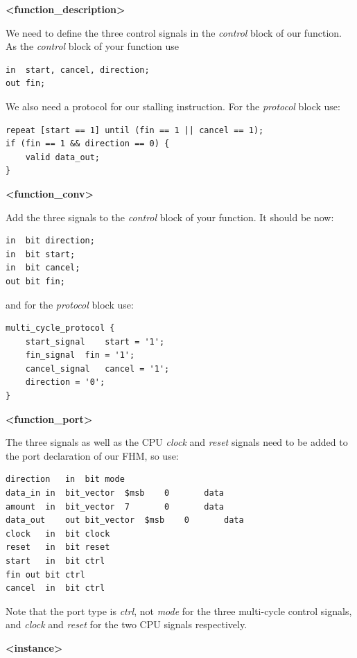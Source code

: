 \textbf{\textless function\_description\textgreater{}}

We need to define the three control signals in the \emph{control} block
of our function. As the \emph{control} block of your function use
\begin{lstlisting}
in  start, cancel, direction;
out fin;	
\end{lstlisting}
We also need a protocol for our stalling instruction. For the
\emph{protocol} block use:
\begin{lstlisting}
repeat [start == 1] until (fin == 1 || cancel == 1);
if (fin == 1 && direction == 0) {
	valid data_out;
}	
\end{lstlisting}
\textbf{\textless function\_conv\textgreater{}}

Add the three signals to the \emph{control} block of your function. It
should be now:
\begin{lstlisting}
in  bit direction;
in  bit start;
in  bit cancel;
out bit fin;	
\end{lstlisting}
and for the \emph{protocol} block use:
\begin{lstlisting}
multi_cycle_protocol {
	start_signal	start = '1';
	fin_signal	fin = '1';
	cancel_signal	cancel = '1';
	direction = '0';
}	
\end{lstlisting}

\textbf{\textless function\_port\textgreater{}}

The three signals as well as the CPU \emph{clock} and \emph{reset}
signals need to be added to the port declaration of our FHM, so use:
\begin{lstlisting}
direction	in  bit	mode
data_in	in  bit_vector	$msb    0       data
amount	in  bit_vector	7       0       data
data_out	out bit_vector	$msb    0       data
clock	in  bit	clock
reset	in  bit	reset
start	in  bit	ctrl
fin	out bit	ctrl
cancel	in  bit	ctrl	
\end{lstlisting}

Note that the port type is \emph{ctrl}, not \emph{mode} for the three
multi-cycle control signals, and \emph{clock} and \emph{reset} for the
two CPU signals respectively.

\textbf{\textless instance\textgreater{}}

